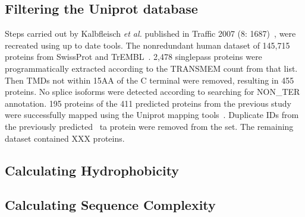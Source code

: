 
\subsection{Filtering the Uniprot database}
Steps carried out by Kalbfleisch \textit{et al.} published in Traffic 2007 (8: 1687)~\cite{Kalbfleisch2007}, were recreated using up to date tools.
The non\-redundant human dataset of 145,715 proteins from SwissProt and TrEMBL~\cite{TheUniProtConsortium2014}.
2,478 singlepass proteins were programmatically extracted according to the TRANSMEM count from that list.
Then TMDs not within 15AA of the C terminal were removed, resulting in 455 proteins.
No splice isoforms were detected according to searching for NON\_TER annotation.
195 proteins of the 411 predicted proteins from the previous study were successfully mapped using the Uniprot mapping tools~\cite{TheUniProtConsortium2014}.
Duplicate IDs from the previously predicted ~\gls{ta} protein were removed from the set.
The remaining dataset contained XXX proteins.

\subsection{Calculating Hydrophobicity}

\subsection{Calculating Sequence Complexity}

